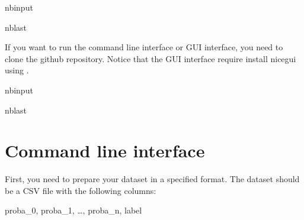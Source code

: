 \documentclass[letterpaper,10pt,english]{sphinxmanual}
\begin{document}
\begin{sphinxuseclass}{nbinput}
\begin{sphinxuseclass}{nblast}
{
\begin{sphinxVerbatim}[commandchars=\\\{\}]
\llap{\color{nbsphinxin}[ ]:\,\hspace{\fboxrule}\hspace{\fboxsep}}   
\end{sphinxVerbatim}
}

\end{sphinxuseclass}
\end{sphinxuseclass}
\sphinxAtStartPar
If you want to run the command line interface or GUI interface, you need to clone the github repository. Notice that the GUI interface require install nicegui using .

\begin{sphinxuseclass}{nbinput}
\begin{sphinxuseclass}{nblast}
{
\begin{sphinxVerbatim}[commandchars=\\\{\}]
\llap{\color{nbsphinxin}[ ]:\,\hspace{\fboxrule}\hspace{\fboxsep}}  
 
   
\end{sphinxVerbatim}
}

\end{sphinxuseclass}
\end{sphinxuseclass}

\section{Command line interface}
\label{\detokenize{notebooks/quickstart:Command-line-interface}}
\sphinxAtStartPar
First, you need to prepare your dataset in a specified format. The dataset should be a CSV file with the following columns:

\sphinxAtStartPar
proba\_0, proba\_1, …, proba\_n, label
\end{document}
